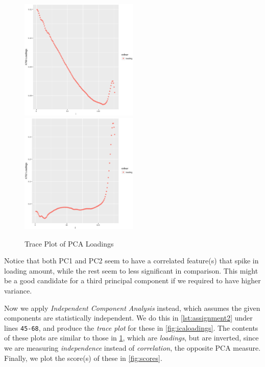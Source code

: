 \documentclass[a4paper, twocolumn]{article}
\begin{document}
        \begin{figure}[h!]
            \centering
            \caption{Trace Plot of PCA Loadings}
            \label{fig:pcloadings}
            \includegraphics[width=0.5\textwidth]{share/x750loadings.eps}
            \includegraphics[width=0.5\textwidth]{share/x752loadings.eps}
        \end{figure}

        Notice that both PC1 and PC2 seem to have a correlated feature(s) that spike in loading amount, while the rest seem to less significant in comparison. This might be a good candidate for a third principal component if we required to have higher variance.

        Now we apply \emph{Independent Component Analysis} instead, which assumes the given components are statistically independent. We do this in \cref{lst:assignment2} under lines \verb|45-68|, and produce the \emph{trace plot} for these in \cref{fig:icaloadings}. The contents of these plots are similar to those in \cref{fig:pcloadings}, which are \emph{loadings}, but are inverted, since we are measuring \emph{independence} instead of \emph{correlation}, the opposite PCA measure. Finally, we plot the score(s) of these in \cref{fig:scores}.
\end{document}
